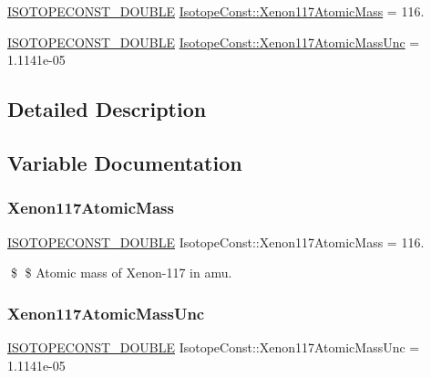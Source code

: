 \begin{DoxyCompactItemize}
\item 
\mbox{\hyperlink{group___isotope_const-_macros_ga8f45a7272ce02c0b4c65c44636ed719a}{I\+S\+O\+T\+O\+P\+E\+C\+O\+N\+S\+T\+\_\+\+D\+O\+U\+B\+LE}} \mbox{\hyperlink{group___isotope_const-_xenon-_xe117_gabd2e46ae0c704bdd96c667d440e9a85c}{Isotope\+Const\+::\+Xenon117\+Atomic\+Mass}} = 116.
\item 
\mbox{\hyperlink{group___isotope_const-_macros_ga8f45a7272ce02c0b4c65c44636ed719a}{I\+S\+O\+T\+O\+P\+E\+C\+O\+N\+S\+T\+\_\+\+D\+O\+U\+B\+LE}} \mbox{\hyperlink{group___isotope_const-_xenon-_xe117_ga3276519c97636879f514c2d541bcfdc5}{Isotope\+Const\+::\+Xenon117\+Atomic\+Mass\+Unc}} = 1.\+1141e-\/05
\end{DoxyCompactItemize}


\subsection{Detailed Description}


\subsection{Variable Documentation}
\mbox{\label{group___isotope_const-_xenon-_xe117_gabd2e46ae0c704bdd96c667d440e9a85c}} 
\subsubsection{\texorpdfstring{Xenon117\+Atomic\+Mass}{Xenon117AtomicMass}}
{\footnotesize\ttfamily \mbox{\hyperlink{group___isotope_const-_macros_ga8f45a7272ce02c0b4c65c44636ed719a}{I\+S\+O\+T\+O\+P\+E\+C\+O\+N\+S\+T\+\_\+\+D\+O\+U\+B\+LE}} Isotope\+Const\+::\+Xenon117\+Atomic\+Mass = 116.}

\$ \$ Atomic mass of Xenon-\/117 in amu. \mbox{\label{group___isotope_const-_xenon-_xe117_ga3276519c97636879f514c2d541bcfdc5}} 
\subsubsection{\texorpdfstring{Xenon117\+Atomic\+Mass\+Unc}{Xenon117AtomicMassUnc}}
{\footnotesize\ttfamily \mbox{\hyperlink{group___isotope_const-_macros_ga8f45a7272ce02c0b4c65c44636ed719a}{I\+S\+O\+T\+O\+P\+E\+C\+O\+N\+S\+T\+\_\+\+D\+O\+U\+B\+LE}} Isotope\+Const\+::\+Xenon117\+Atomic\+Mass\+Unc = 1.\+1141e-\/05}


